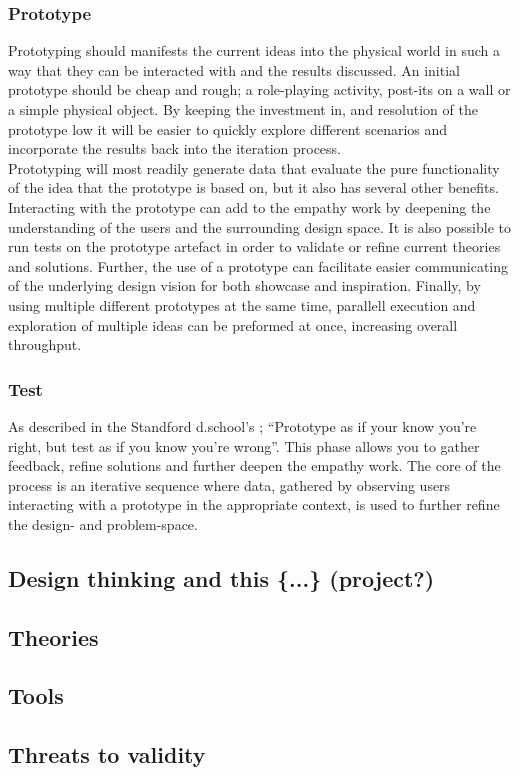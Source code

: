   \subsubsection{Prototype}

    Prototyping should manifests the current ideas into the physical world in
    such a way that they can be interacted with and the results discussed. An
    initial prototype should be cheap and rough; a role-playing activity,
    post-its on a wall or a simple physical object. By keeping the investment
    in, and resolution of the prototype low it will be easier to quickly explore
    different scenarios and incorporate the results back into the iteration
    process. \\

    Prototyping will most readily generate data that evaluate the pure
    functionality of the idea that the prototype is based on, but it also has
    several other benefits. Interacting with the prototype can add to the
    empathy work by deepening the understanding of the users and the
    surrounding design space.  It is also possible to run tests on the
    prototype artefact in order to validate or refine current theories and
    solutions.  Further, the use of a prototype can facilitate easier
    communicating of the underlying design vision for both showcase and
    inspiration. Finally, by using multiple different prototypes at the same
    time, parallell execution and exploration of multiple ideas can be
    preformed at once, increasing overall throughput.

  \subsubsection{Test}

  As described in the Standford d.school's {\stanfordBootleg}%
  \cite[V]{c_design_thinking_online_nonpeer_dschool_stanford};
    \enquote{Prototype as if your know you're right, but test as if you know
      you're wrong}. This phase allows you to gather feedback, refine
    solutions and further deepen the empathy work. The core of the process is
    an iterative sequence where data, gathered by observing users  interacting
    with a prototype in the appropriate context, is used to further refine the
    design- and problem-space.

\subsection{Design thinking and this \{...\} (project?)}


\subsection{Theories}
\subsection{Tools}
\subsection{Threats to validity}
